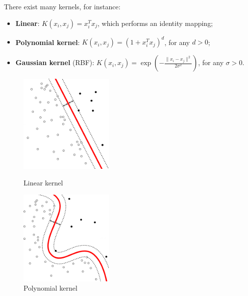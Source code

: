 There exist many kernels, for instance:
\begin{itemize}
	\item \textbf{Linear}: $K(x_i,x_j) = x_i^Tx_j$, which performs an identity mapping;
	\item \textbf{Polynomial kernel}: $K(x_i,x_j) = (1 + x_i^Tx_j)^d$, for any $d > 0$;
	\item \textbf{Gaussian kernel} (RBF): 
	$K(x_i, x_j) = \exp\left(-\frac{\|x_i - x_j\|^2}{2\sigma^2}\right)$, for any $\sigma > 0$.
\end{itemize}
\begin{figure}[!h]
	\begin{minipage}[t]{0.5\linewidth}
		\centering
		\includegraphics[width=0.41\textwidth]{img/Linear_Kernel_Machine.png}
		\caption{Linear kernel}
		\label{f1}
	\end{minipage}
	\hspace{0.1cm}
	\begin{minipage}[t]{0.5\linewidth} 
		\centering
		\includegraphics[width=0.41\textwidth]{img/Poly_Kernel_Machine.png}
		\caption{Polynomial kernel}
		\label{f2}
	\end{minipage}        
\end{figure} 

